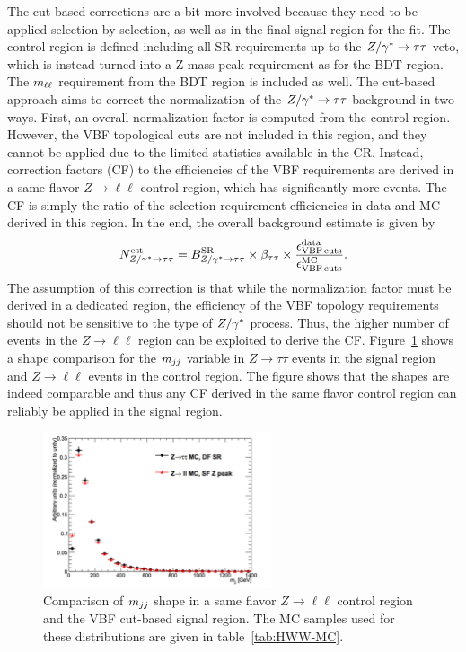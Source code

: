The cut-based corrections are a bit more involved because they need to be applied selection by selection, as well as in the final signal region for the fit. The control region is defined including all SR requirements up to the $Z/\gamma^{\ast} \to \tau\tau$ veto, which is instead turned into a Z mass peak requirement as for the BDT region. The $m_{\ell\ell}$ requirement from the BDT region is included as well. The cut-based approach aims to correct the normalization of the $Z/\gamma^{\ast} \to\tau\tau$ background in two ways. First, an overall normalization factor is computed from the control region. However, the VBF topological cuts are not included in this region, and they cannot be applied due to the limited statistics available in the CR. Instead, correction factors (CF) to the efficiencies of the VBF requirements are derived in a same flavor $Z\to\ell\ell$ control region, which has significantly more events. The CF is simply the ratio of the selection requirement efficiencies in data and MC derived in this region. In the end, the overall background estimate is given by 
%
\begin{equation}
N^{\rm est}_{Z/\gamma^{\ast} \to \tau\tau} = B^{\rm SR}_{Z/\gamma^{\ast} \to \tau\tau} \times \beta_{\tau\tau} \times \frac{\epsilon_{\rm VBF\,cuts}^{\rm data}}{\epsilon_{\rm VBF\,cuts}^{\rm MC}}.
\label{eqn:zttest}
\end{equation}
%
The assumption of this correction is that while the normalization factor must be derived in a dedicated region, the efficiency of the VBF topology requirements should not be sensitive to the type of $Z/\gamma^{\ast}$ process. Thus, the higher number of events in the $Z\to\ell\ell$ region can be exploited to derive the CF. Figure~\ref{fig:vbf_ztt_comp} shows a shape comparison for the $m_{jj}$ variable in $Z\to\tau\tau$ events in the signal region and $Z\to\ell\ell$ events in the control region. The figure shows that the shapes are indeed comparable and thus any CF derived in the same flavor control region can reliably be applied in the signal region. 

\begin{figure}[h!]
  \centering
  \captionsetup{justification=centering}
  \includegraphics[width=0.6\textwidth]{figures/VBF_DYtt_shape_comp}
  \caption{Comparison of $m_{jj}$ shape in a same flavor $Z\to\ell\ell$ control region and the VBF cut-based signal region. The MC samples used for these distributions are given in table~\ref{tab:HWW-MC}.}
  \label{fig:vbf_ztt_comp}
\end{figure}

